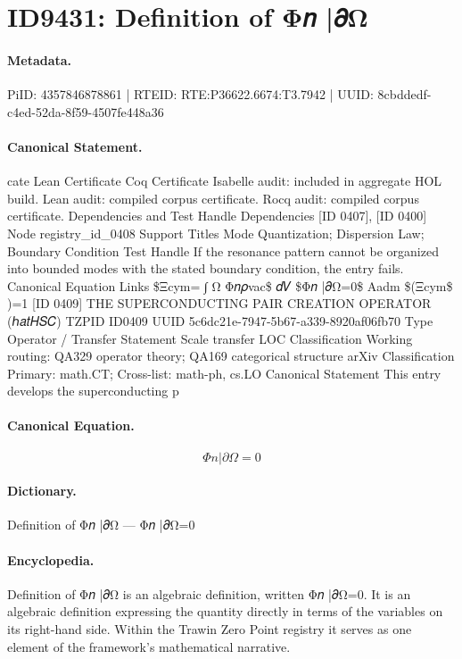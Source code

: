 \section*{ID9431: Definition of Φ𝑛 |𝜕Ω}
\paragraph{Metadata.}
PiID: 4357846878861 | RTEID: RTE:P36622.6674:T3.7942 | UUID: 8cbddedf-c4ed-52da-8f59-4507fe448a36

\paragraph{Canonical Statement.}
cate Lean Certificate Coq Certificate Isabelle audit: included in aggregate HOL build. Lean audit: compiled corpus certificate. Rocq audit: compiled corpus certificate. Dependencies and Test Handle Dependencies [ID 0407], [ID 0400] Node registry\_id\_0408 Support Titles Mode Quantization; Dispersion Law; Boundary Condition Test Handle If the resonance pattern cannot be organized into bounded modes with the stated boundary condition, the entry fails. Canonical Equation Links \$Ξcym= ∫ Ω Φ𝑛𝜌vac\$ 𝑑𝑉 \$Φ𝑛 |𝜕Ω=0\$ Aadm \$(Ξcym\$ )=1 [ID 0409] THE SUPERCONDUCTING PAIR CREATION OPERATOR (ℎ𝑎𝑡𝐻𝑆𝐶) TZPID ID0409 UUID 5c6dc21e-7947-5b67-a339-8920af06fb70 Type Operator / Transfer Statement Scale transfer LOC Classification Working routing: QA329 operator theory; QA169 categorical structure arXiv Classification Primary: math.CT; Cross-list: math-ph, cs.LO Canonical Statement This entry develops the superconducting p

\paragraph{Canonical Equation.}
\[
Φ𝑛 |𝜕Ω=0
\]

\paragraph{Dictionary.}
Definition of Φ𝑛 |𝜕Ω — Φ𝑛 |𝜕Ω=0

\paragraph{Encyclopedia.}
Definition of Φ𝑛 |𝜕Ω is an algebraic definition, written Φ𝑛 |𝜕Ω=0. It is an algebraic definition expressing the quantity directly in terms of the variables on its right-hand side. Within the Trawin Zero Point registry it serves as one element of the framework's mathematical narrative.
